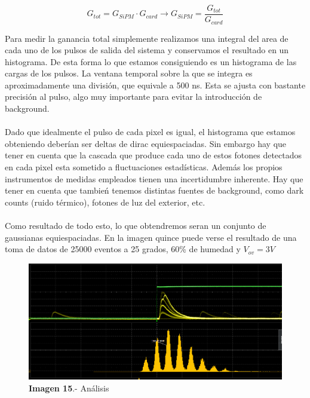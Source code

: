$$G_{tot}=G_{SiPM} \cdotp G_{card} \longrightarrow G_{SiPM} = \frac{G_{tot}}{G_{card}}$$

Para medir la ganancia total simplemente realizamos una integral del area de cada uno de los pulsos de salida del sistema y conservamos el resultado en un histograma. De esta forma lo que estamos consiguiendo es un histograma de las cargas de los pulsos. La ventana temporal sobre la que se integra es aproximadamente una división, que equivale a 500 ns. Esta se ajusta con bastante precisión al pulso, algo muy importante para evitar la introducción de background.

\paragraph {}
Dado que idealmente el pulso de cada pixel es igual, el histograma que estamos obteniendo deberían ser deltas de dirac equiespaciadas. Sin embargo hay que tener en cuenta que la cascada que produce cada uno de estos fotones detectados en cada pixel esta sometido a fluctuaciones estadísticas. Además los propios instrumentos de medidas empleados tienen una incertidumbre inherente. Hay que tener en cuenta que tambień tenemos distintas fuentes de background, como dark counts (ruido térmico), fotones de luz del exterior, etc. 

\paragraph {}
Como resultado de todo esto, lo que obtendremos seran un conjunto de gaussianas equiespaciadas. En la imagen quince puede verse el resultado de una toma de datos de 25000 eventos a 25 grados, 60\% de humedad y $V_{ov}=3V$

\begin{figure}[hbtp]
 \centering
 \includegraphics[scale=0.2]{Analisis.png}
 \caption{\textbf{Imagen 15}.- Análisis}
 \end{figure}

